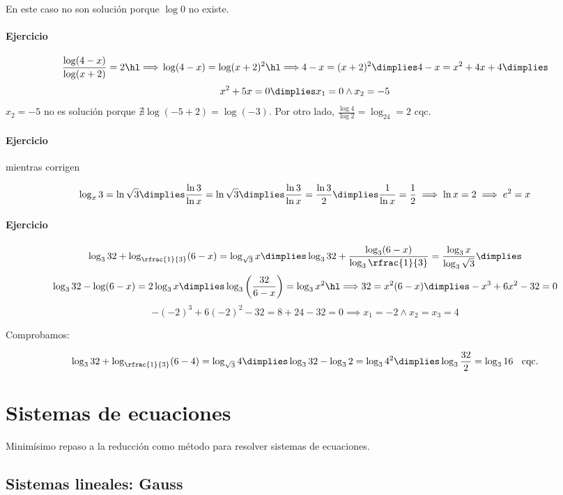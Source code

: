 En este caso no son solución porque $\log 0$ no existe.

\paragraph{Ejercicio}
\[
\frac{\log (4-x)}{\log(x+2)}=2 \cimplies \log(4-x) = \log(x+2)^2 \cimplies 4-x=(x+2)^2 \dimplies 4-x=x^2+4x+4 \dimplies
	\]
	\[ x^2+5x=0 \dimplies x_1=0 \wedge x_2=-5
\]
$x_2=-5$ no es solución porque $\nexists\log(-5+2)=\log(-3)$. Por otro lado, $\frac{\log4}{\log2} = \log_24=2$ cqc.



\paragraph{Ejercicio} mientras corrigen

\[
	\log_x 3 = \ln \sqrt{3} \dimplies \frac{\ln3}{\ln x}=\ln\sqrt{3} \dimplies \frac{\ln3}{\ln x}=\frac{\ln3}{2} \dimplies \frac{1}{\ln x}=\frac{1}{2} \implies \ln x = 2 \implies e^2=x
\]

\paragraph{Ejercicio}
\[
	\log_332+\log_{\rfrac{1}{3}}(6-x) = \log_{\sqrt{3}}x \dimplies \log_332+\frac{\log_3(6-x)}{\log_3\rfrac{1}{3}} = \frac{\log_3x}{\log_3{\sqrt{3}}} \dimplies 
\]
\[
	\log_332-\log(6-x)=2\log_3x\dimplies \log_3\left(\frac{32}{6-x}\right)=\log_3x^2 \cimplies 32=x^2(6-x) \dimplies -x^3+6x^2-32 = 0
\]
\[
	-(-2)^3 + 6(-2)^2-32 = 8+24-32 = 0\implies x_1=-2 \wedge x_2=x_3=4
\]
 
Comprobamos:

\[
	\log_332+\log_{\rfrac{1}{3}}(6-4) = \log_{\sqrt{3}}4 \dimplies \log_332-\log_32=\log_34^2 \dimplies \log_3\frac{32}{2}=\log_316 \;\;\text{   cqc.}
\]



\section{Sistemas de ecuaciones}

Minimísimo repaso a la reducción como método para resolver sistemas de ecuaciones.

\subsection{Sistemas lineales: Gauss}

